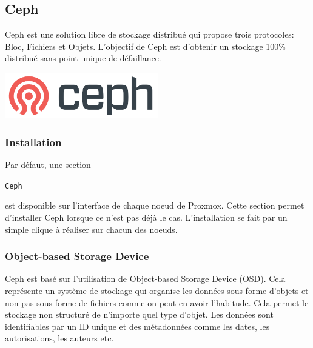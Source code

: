 \documentclass[12pt, a4paper, twoside]{article}
\begin{document}
\subsection{Ceph}
\noindent%
\begin{minipage}{.7\textwidth}%
\gls{Ceph} est une solution libre de stockage distribué qui propose trois protocoles: Bloc, Fichiers et Objets.
L'objectif de \gls{Ceph} est d'obtenir un stockage 100\% distribué sans point unique de défaillance.

\end{minipage}%
\hfill
\begin{minipage}{.3\textwidth}%
\begin{center}
\includegraphics[width=0.5\textwidth]{src/logo_ceph.png}
\end{center}
\end{minipage}%

\subsubsection{Installation}
Par défaut, une section \begin{code}\texttt{\gls{Ceph}}\end{code} est disponible sur l'interface de chaque noeud de \gls{Proxmox}. 
Cette section permet d'installer \gls{Ceph} lorsque ce n'est pas déjà le cas.
L'installation se fait par un simple clique à réaliser sur chacun des noeuds.

\subsubsection{Object-based Storage Device}
\gls{Ceph} est basé sur l'utilisation de Object-based Storage Device (\gls{OSD}).
Cela représente un système de stockage qui organise les données sous forme d'objets et non pas sous forme de fichiers comme on peut en avoir l'habitude.
Cela permet le stockage non structuré de n'importe quel type d'objet.
Les données sont identifiables par un ID unique et des métadonnées comme les dates, les autorisations, les auteurs etc.
\end{document}
